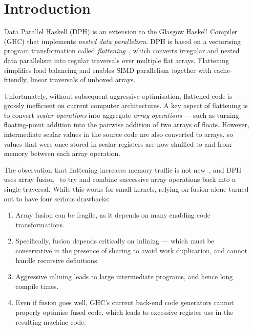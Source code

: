 \section{Introduction}

Data Parallel Haskell (DPH) is an extension to the Glasgow Haskell Compiler (GHC) that implements \emph{nested data parallelism}. DPH is based on a vectorising program transformation called \emph{flattening}~\cite{blelloch-sabot:compiling-collection, keller-chak:tflat, chak-keller:more-types, leshchinskiy-etal:ho-flattening, Jones08harnessingthe}, which converts irregular and nested data parallelism into regular traversals over multiple flat arrays. Flattening simplifies load balancing and enables SIMD parallelism together with cache-friendly, linear traversals of unboxed arrays. 

Unfortunately, without subsequent aggressive optimisation, flattened code is grossly inefficient on current computer architectures. A key aspect of flattening is to convert \emph{scalar operations} into aggregate \emph{array operations} --- such as turning floating-point addition into the pairwise addition of two arrays of floats. However, intermediate scalar values in the source code are also converted to arrays, so values that were once stored in scalar registers are now shuffled to and from memory between each array operation.

The observation that flattening increases memory traffic is not new~\cite{so-etal:dp-many-core, chak:functional-array-fusion, chak-etal:partial-vectorisation, chak-etal:status-report}, and DPH uses array fusion~\cite{coutts:rewriting-strings, coutts:stream-fusion} to try and combine successive array operations back into a single traversal. While this works for small kernels, relying on fusion alone turned out to have four serious drawbacks:
%
\begin{enumerate}
\item Array fusion can be fragile, as it depends on many enabling code transformations.

\item Specifically, fusion depends critically on inlining --- which must be conservative in the presence of sharing to avoid work duplication, and cannot handle recursive definitions.

\item Aggressive inlining leads to large intermediate programs, and hence long compile times.

\item Even if fusion goes well, GHC's current back-end code generators cannot properly optimise fused code, which leads to excessive register use in the resulting machine code.
\end{enumerate}

